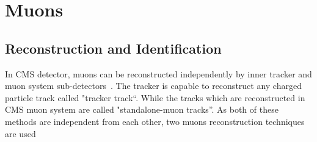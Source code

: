 \section{Muons}\label{chapter3_sec2}
\subsection{Reconstruction and Identification}
In CMS detector, muons can be reconstructed independently by inner tracker and muon system sub-detectors~\cite{cms:38a}. The tracker is capable to reconstruct any charged 
particle track called "tracker track``. While the tracks which are reconstructed in CMS muon system are called "standalone-muon tracks''. As both of these
methods are independent from each other, two muons reconstruction techniques are used 

